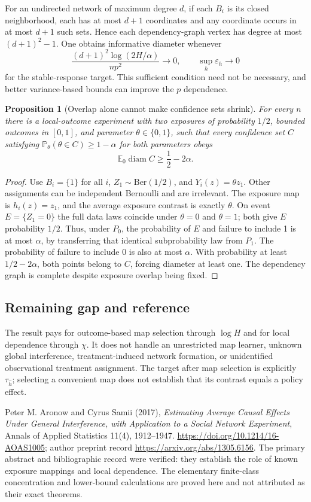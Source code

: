 \documentclass[11pt,a4paper]{article}
\newtheorem{proposition}[theorem]{Proposition}
\newcommand{\E}{\mathbb E}
\newcommand{\Prb}{\mathbb P}
\newcommand{\diam}{\operatorname{diam}}
\begin{document}
For an undirected network of maximum degree $d$, if each $B_i$ is its closed neighborhood, each has at most $d+1$ coordinates and any coordinate occurs in at most $d+1$ such sets. Hence each dependency-graph vertex has degree at most $(d+1)^2-1$. One obtains informative diameter whenever
\[
 \frac{(d+1)^2\log(2H/\alpha)}{np^2}\longrightarrow0,
 \qquad\sup_h\varepsilon_h\longrightarrow0
\]
for the stable-response target. This sufficient condition need not be necessary, and better variance-based bounds can improve the $p$ dependence.

\begin{proposition}[Overlap alone cannot make confidence sets shrink]
For every $n$ there is a local-outcome experiment with two exposures of probability $1/2$, bounded outcomes in $[0,1]$, and parameter $\theta\in\{0,1\}$, such that every confidence set $C$ satisfying $\Prb_\theta(\theta\in C)\geq1-\alpha$ for both parameters obeys
\[
 \E_0\diam C\geq\frac12-2\alpha.
\]
\end{proposition}
\begin{proof}
Use $B_i=\{1\}$ for all $i$, $Z_1\sim\mathrm{Ber}(1/2)$, and $Y_i(z)=\theta z_1$. Other assignments can be independent Bernoulli and are irrelevant. The exposure map is $h_i(z)=z_1$, and the average exposure contrast is exactly $\theta$. On event $E=\{Z_1=0\}$ the full data laws coincide under $\theta=0$ and $\theta=1$; both give $E$ probability $1/2$. Thus, under $P_0$, the probability of $E$ and failure to include 1 is at most $\alpha$, by transferring that identical subprobability law from $P_1$. The probability of failure to include 0 is also at most $\alpha$. With probability at least $1/2-2\alpha$, both points belong to $C$, forcing diameter at least one. The dependency graph is complete despite exposure overlap being fixed.
\end{proof}

\subsection*{Remaining gap and reference}
The result pays for outcome-based map selection through $\log H$ and for local dependence through $\chi$. It does not handle an unrestricted map learner, unknown global interference, treatment-induced network formation, or unidentified observational treatment assignment. The target after map selection is explicitly $\tau_{\widehat h}$; selecting a convenient map does not establish that its contrast equals a policy effect.

Peter M. Aronow and Cyrus Samii (2017), \emph{Estimating Average Causal Effects Under General Interference, with Application to a Social Network Experiment}, Annals of Applied Statistics 11(4), 1912--1947. \url{https://doi.org/10.1214/16-AOAS1005}; author preprint record \url{https://arxiv.org/abs/1305.6156}. The primary abstract and bibliographic record were verified: they establish the role of known exposure mappings and local dependence. The elementary finite-class concentration and lower-bound calculations are proved here and not attributed as their exact theorems.
\end{document}
